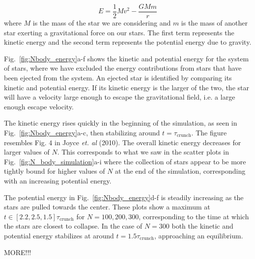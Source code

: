 \documentclass{article}
\begin{document}
\begin{multicols}{2}
\begin{equation}\label{eq:E_tot}
	E = \frac{1}{2}Mv^2 - \frac{GMm}{r}
\end{equation}
where $M$ is the mass of the star we are considering and $m$ is the mass of another star exerting a gravitational force on our stars. The first term represents the kinetic energy and the second term represents the potential energy due to gravity.

Fig.~\ref{fig:Nbody_energy}a-f shows the kinetic and potential energy for the system of stars, where we have excluded the energy contributions from stars that have been ejected from the system. An ejected star is identified by comparing its kinetic and potential energy. If its kinetic energy is the larger of the two, the star will have a velocity large enough to escape the gravitational field, i.e. a large enough escape velocity.

The kinetic energy rises quickly in the beginning of the simulation, as seen in Fig.~\ref{fig:Nbody_energy}a-c, then stabilizing around $t = \tau_{\mathrm{crunch}}$. The figure resembles Fig. 4 in Joyce \textit{et. al} (2010). The overall kinetic energy decreases for larger values of $N$. This corresponds to what we saw in the scatter plots in Fig.~\ref{fig:N_body_simulation}a-i where the collection of stars appear to be more tightly bound for higher values of $N$ at the end of the simulation, corresponding with an increasing potential energy.  

The potential energy in Fig.~\ref{fig:Nbody_energy}d-f is steadily increasing as the stars are pulled towards the center. These plots show a maximum at $t \in [2.2, 2.5, 1.5] \tau_{\mathrm{crunch}}$ for $N = 100,200,300$, corresponding to the time at which the stars are closest to collapse. In the case of $N = 300$ both the kinetic and potential energy stabilizes at around $t = 1.5\tau_{\mathrm{crunch}}$, approaching an equilibrium. 

MORE!!!


\end{multicols}
\end{document}
